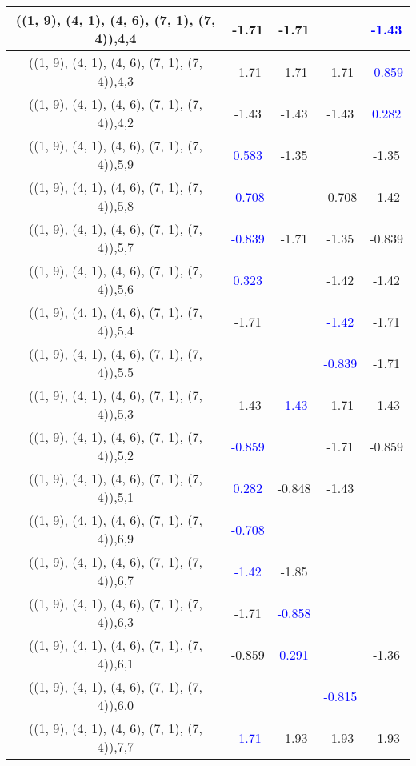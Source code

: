 \documentclass{article}
\begin{document}
\begin{center}
\begin{longtable}{|c|c|c|c|c|}
        	\hline
        	((1, 9), (4, 1), (4, 6), (7, 1), (7, 4)),4,4&-1.71&-1.71&& \textcolor{blue}{-1.43}\\
        	\hline
        	((1, 9), (4, 1), (4, 6), (7, 1), (7, 4)),4,3&-1.71&-1.71&-1.71& \textcolor{blue}{-0.859}\\
        	\hline
        	((1, 9), (4, 1), (4, 6), (7, 1), (7, 4)),4,2&-1.43&-1.43&-1.43& \textcolor{blue}{0.282}\\
        	\hline
        	((1, 9), (4, 1), (4, 6), (7, 1), (7, 4)),5,9& \textcolor{blue}{0.583}&-1.35&&-1.35\\
        	\hline
        	((1, 9), (4, 1), (4, 6), (7, 1), (7, 4)),5,8& \textcolor{blue}{-0.708}&&-0.708&-1.42\\
        	\hline
        	((1, 9), (4, 1), (4, 6), (7, 1), (7, 4)),5,7& \textcolor{blue}{-0.839}&-1.71&-1.35&-0.839\\
        	\hline
        	((1, 9), (4, 1), (4, 6), (7, 1), (7, 4)),5,6& \textcolor{blue}{0.323}&&-1.42&-1.42\\
        	\hline
        	((1, 9), (4, 1), (4, 6), (7, 1), (7, 4)),5,4&-1.71&& \textcolor{blue}{-1.42}&-1.71\\
        	\hline
        	((1, 9), (4, 1), (4, 6), (7, 1), (7, 4)),5,5&&& \textcolor{blue}{-0.839}&-1.71\\
        	\hline
        	((1, 9), (4, 1), (4, 6), (7, 1), (7, 4)),5,3&-1.43& \textcolor{blue}{-1.43}&-1.71&-1.43\\
        	\hline
        	((1, 9), (4, 1), (4, 6), (7, 1), (7, 4)),5,2& \textcolor{blue}{-0.859}&&-1.71&-0.859\\
        	\hline
        	((1, 9), (4, 1), (4, 6), (7, 1), (7, 4)),5,1& \textcolor{blue}{0.282}&-0.848&-1.43&\\
        	\hline
        	((1, 9), (4, 1), (4, 6), (7, 1), (7, 4)),6,9& \textcolor{blue}{-0.708}&&&\\
        	\hline
        	((1, 9), (4, 1), (4, 6), (7, 1), (7, 4)),6,7& \textcolor{blue}{-1.42}&-1.85&&\\
        	\hline
        	((1, 9), (4, 1), (4, 6), (7, 1), (7, 4)),6,3&-1.71& \textcolor{blue}{-0.858}&&\\
        	\hline
        	((1, 9), (4, 1), (4, 6), (7, 1), (7, 4)),6,1&-0.859& \textcolor{blue}{0.291}&&-1.36\\
        	\hline
        	((1, 9), (4, 1), (4, 6), (7, 1), (7, 4)),6,0&&& \textcolor{blue}{-0.815}&\\
        	\hline
        	((1, 9), (4, 1), (4, 6), (7, 1), (7, 4)),7,7& \textcolor{blue}{-1.71}&-1.93&-1.93&-1.93\\

\end{longtable}
\end{center}
\end{document}
